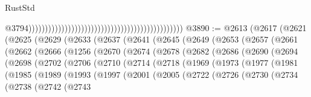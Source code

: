 \begin{lexlean}{RustStd}
\begin{coremodule}
                                                                                                  @3794)))))))))))))))))))))))))))))))))))))))))))))))
@3890 := @2613
    (@2617
      (@2621
        (@2625
          (@2629
            (@2633
              (@2637
                (@2641
                  (@2645
                    (@2649
                      (@2653
                        (@2657
                          (@2661
                            (@2662
                              (@2666
                                (@1256
                                  (@2670
                                    (@2674
                                      (@2678
                                        (@2682
                                          (@2686
                                            (@2690
                                              (@2694
                                                (@2698
                                                  (@2702
                                                    (@2706
                                                      (@2710
                                                        (@2714
                                                          (@2718
                                                            (@1969
                                                              (@1973
                                                                (@1977
                                                                  (@1981
                                                                    (@1985
                                                                      (@1989
                                                                        (@1993
                                                                          (@1997
                                                                            (@2001
                                                                              (@2005
                                                                                (@2722
                                                                                  (@2726
                                                                                    (@2730
                                                                                      (@2734
                                                                                        (@2738
                                                                                          (@2742
                                                                                            (@2743

\end{coremodule}
\end{lexlean}
